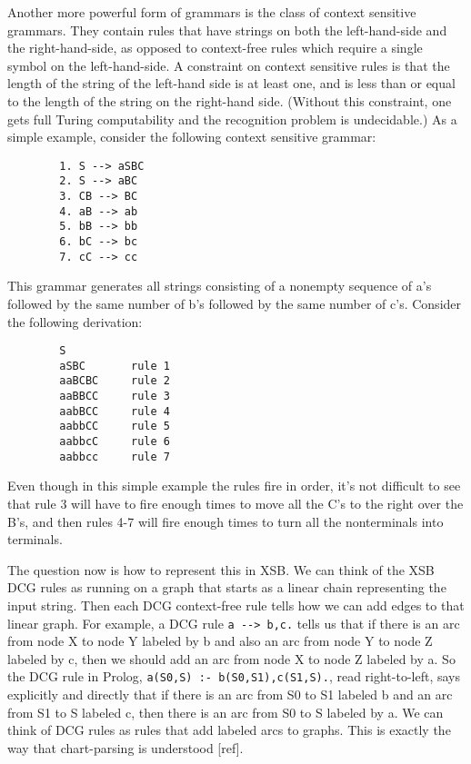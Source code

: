 Another more powerful form of grammars is the class of context
sensitive grammars.  They contain rules that have strings on both the
left-hand-side and the right-hand-side, as opposed to context-free
rules which require a single symbol on the left-hand-side.  A
constraint on context sensitive rules is that the length of the string
of the left-hand side is at least one, and is less than or equal to
the length of the string on the right-hand side.  (Without this
constraint, one gets full Turing computability and the recognition
problem is undecidable.)  As a simple example, consider the following
context sensitive grammar:
\begin{verbatim}
        1. S --> aSBC
        2. S --> aBC
        3. CB --> BC
        4. aB --> ab
        5. bB --> bb
        6. bC --> bc
        7. cC --> cc
\end{verbatim}
This grammar generates all strings consisting of a nonempty sequence
of a's followed by the same number of b's followed by the same number
of c's.  Consider the following derivation:
\begin{verbatim}
        S
        aSBC       rule 1
        aaBCBC     rule 2
        aaBBCC     rule 3
        aabBCC     rule 4
        aabbCC     rule 5
        aabbcC     rule 6
        aabbcc     rule 7
\end{verbatim}
Even though in this simple example the rules fire in order, it's not
difficult to see that rule 3 will have to fire enough times to move
all the C's to the right over the B's, and then rules 4-7 will fire
enough times to turn all the nonterminals into terminals.

The question now is how to represent this in XSB.  We can think of the
XSB DCG rules as running on a graph that starts as a linear chain
representing the input string.  Then each DCG context-free rule tells
how we can add edges to that linear graph.  For example, a DCG rule
\verb|a --> b,c.| tells us that if there is an arc from node X to node
Y labeled by b and also an arc from node Y to node Z labeled by c,
then we should add an arc from node X to node Z labeled by a.  So the
DCG rule in Prolog, \verb+a(S0,S) :- b(S0,S1),c(S1,S).+, read
right-to-left, says explicitly and directly that if there is an arc
from S0 to S1 labeled b and an arc from S1 to S labeled c, then there
is an arc from S0 to S labeled by a.  We can think of DCG rules as
rules that add labeled arcs to graphs.  This is exactly the way that
chart-parsing is understood [ref].

